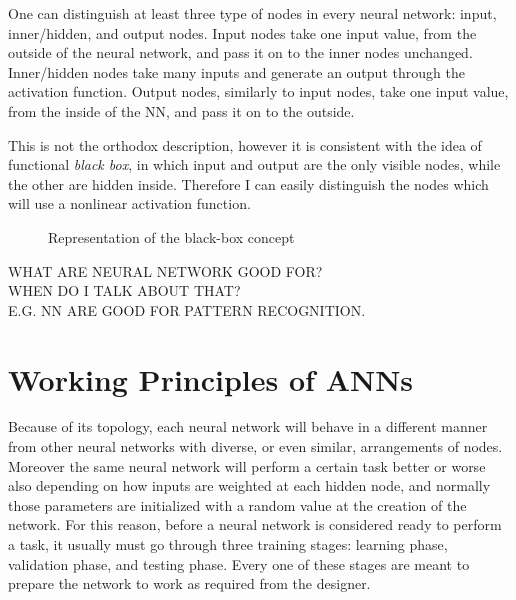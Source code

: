 One can distinguish at least three type of nodes in every neural network: input, inner/hidden, and output nodes.
Input nodes take one input value, from the outside of the neural network, and pass it on to the inner nodes unchanged.
Inner/hidden nodes take many inputs and generate an output through the activation function.
Output nodes, similarly to input nodes, take one input value, from the inside of the NN, and pass it on to the outside.

This is not the orthodox description, however it is consistent with the idea of functional \textit{black box}, in which input and output are the only visible nodes, while the other are hidden inside.
Therefore I can easily distinguish the nodes which will use a nonlinear activation function.

\begin{figure}[ht]
	\centering
	
	\caption{Representation of the black-box concept}
	\label{fig:black_box_NN}
\end{figure}


\noindent\uppercase{\large{What are neural network good for?\\ when do i talk about that?\\ e.g. NN are good for pattern recognition.}}
\normalsize

\section{Working Principles of ANNs}
\label{sec:Working_Principles_of_ANNs}
Because of its topology, each neural network will behave in a different manner from other neural networks with diverse, or even similar, arrangements of nodes.
Moreover the same neural network will perform a certain task better or worse also depending on how inputs are weighted at each hidden node, and normally those parameters are initialized with a random value at the creation of the network.
For this reason, before a neural network is considered ready to perform a task, it usually must go through three training stages: learning phase, validation phase, and testing phase.
Every one of these stages are meant to prepare the network to work as required from the designer.

